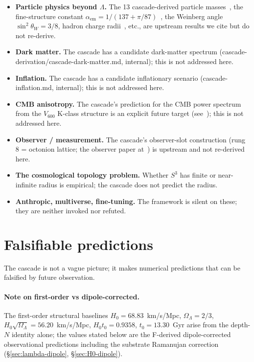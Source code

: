 \documentclass[11pt]{article}
\theoremstyle{plain}
\theoremstyle{definition}
\theoremstyle{remark}
\begin{document}
\begin{itemize}[leftmargin=2em]
\item \textbf{Particle physics beyond $\Lambda$.} The 13 cascade-derived particle masses~\citep{SmartV}, the fine-structure constant $\alpha_\mathrm{em} = 1/(137 + \pi/87)$~\citep{SmartXXII}, the Weinberg angle $\sin^2\theta_W = 3/8$, hadron charge radii~\citep{SmartXXXII}, etc., are upstream results we cite but do not re-derive.
\item \textbf{Dark matter.} The cascade has a candidate dark-matter spectrum (cascade-derivation/cascade-dark-matter.md, internal); this is not addressed here.
\item \textbf{Inflation.} The cascade has a candidate inflationary scenario (cascade-inflation.md, internal); this is not addressed here.
\item \textbf{CMB anisotropy.} The cascade's prediction for the CMB power spectrum from the $V_{600}$ K-class structure is an explicit future target (see~\citealp{v600Unified}); this is not addressed here.
\item \textbf{Observer / measurement.} The cascade's observer-slot construction (rung 8 = octonion lattice; the observer paper at~\citealp{realisation}) is upstream and not re-derived here.
\item \textbf{The cosmological topology problem.} Whether $S^3$ has finite or near-infinite radius is empirical; the cascade does not predict the radius.
\item \textbf{Anthropic, multiverse, fine-tuning.} The framework is silent on these; they are neither invoked nor refuted.
\end{itemize}

\section{Falsifiable predictions}\label{sec:predictions}

The cascade is not a vague picture; it makes numerical predictions that can be falsified by future observation.

\paragraph{Note on first-order vs dipole-corrected.} The first-order structural baselines $H_0 = 68.83$~km/s/Mpc, $\Omega_\Lambda = 2/3$, $H_0 \sqrt{\Omega_\Lambda} = 56.20$~km/s/Mpc, $H_0 t_0 = 0.9358$, $t_0 = 13.30$~Gyr arise from the depth-$N$ identity alone; the values stated below are the F-derived dipole-corrected observational predictions including the substrate Ramanujan correction (\S\ref{sec:lambda-dipole}, \S\ref{sec:H0-dipole}).
\end{document}
